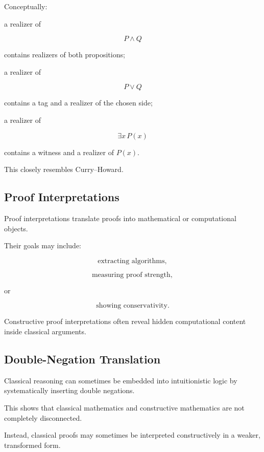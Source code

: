 Conceptually:

a realizer of

\[
P\land Q
\]

contains realizers of both propositions;

a realizer of

\[
P\lor Q
\]

contains a tag and a realizer of the chosen side;

a realizer of

\[
\exists x\,P(x)
\]

contains a witness and a realizer of \(P(x)\).

This closely resembles Curry--Howard.

\subsection{Proof Interpretations}
\label{subsec:constructive-proof-interpretations}

Proof interpretations translate proofs into mathematical or computational
objects.

Their goals may include:

\[
\boxed{
\text{extracting algorithms},
}
\]

\[
\boxed{
\text{measuring proof strength},
}
\]

or

\[
\boxed{
\text{showing conservativity}.
}
\]

Constructive proof interpretations often reveal hidden computational content
inside classical arguments.

\subsection{Double-Negation Translation}
\label{subsec:double-negation-translation}

Classical reasoning can sometimes be embedded into intuitionistic logic by
systematically inserting double negations.

This shows that classical mathematics and constructive mathematics are not
completely disconnected.

Instead, classical proofs may sometimes be interpreted constructively in a
weaker, transformed form.

